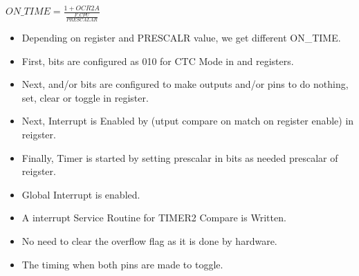 \begin{center}
    $ON\_TIME = \frac{1 + OCR2A}{\frac{F\_CPU}{PRESCALAR}}$
\end{center}
\begin{itemize}
    \item Depending on  register and PRESCALR value, we get different ON\_TIME.
    \item First,  bits are configured as 010 for CTC Mode in  and  registers.
    \item Next,  and/or  bits are configured to make outputs  and/or  pins to do nothing, set, clear or toggle in  register.
    \item Next, Interrupt is Enabled by  (utput compare on match on  register enable) in  reigster.
    \item Finally, Timer is started by setting prescalar in  bits as needed prescalar of  reigster.
    \item Global Interrupt is enabled.
    \item A interrupt Service Routine for TIMER2 Compare is Written.
    \item No need to clear the overflow flag as it is done by hardware.
    \item The timing when both pins  are made to toggle.
\end{itemize}



